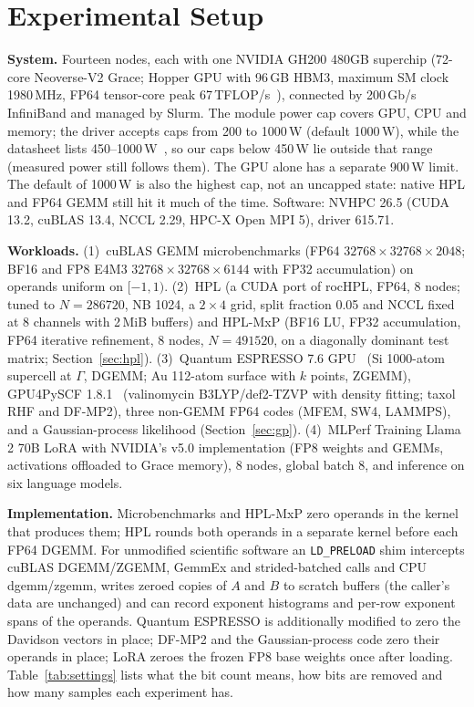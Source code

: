 \documentclass[conference]{IEEEtran}
\newcommand{\W}{\,W}
\begin{document}
\section{Experimental Setup}\label{sec:setup}

\textbf{System.} Fourteen nodes, each with one NVIDIA GH200 480GB superchip (72-core Neoverse-V2 Grace; Hopper GPU
with 96\,GB HBM3, maximum SM clock 1980\,MHz, FP64 tensor-core peak 67\,TFLOP/s~\cite{NVIDIAGH200}), connected by
200\,Gb/s InfiniBand and managed by Slurm. The module power cap covers GPU, CPU and memory; the driver accepts caps
from 200 to 1000\W{} (default 1000\W), while the datasheet lists 450--1000\W~\cite{NVIDIAGH200}, so our caps below
450\W{} lie outside that range (measured power still follows them). The GPU alone has a separate 900\W{} limit.
The default of 1000\W{} is also the highest cap, not an uncapped state: native HPL and FP64 GEMM still hit it much of
the time. Software: NVHPC 26.5 (CUDA 13.2, cuBLAS 13.4, NCCL 2.29, HPC-X Open MPI 5), driver 615.71.

\textbf{Workloads.} (1)~cuBLAS GEMM microbenchmarks (FP64 $32768{\times}32768{\times}2048$; BF16 and FP8 E4M3
$32768{\times}32768{\times}6144$ with FP32 accumulation) on operands uniform on $[-1,1)$. (2)~HPL (a CUDA port of
rocHPL, FP64, 8 nodes; tuned to $N=286720$, NB 1024, a $2\times4$ grid, split fraction 0.05 and NCCL fixed at
8 channels with 2\,MiB buffers) and HPL-MxP (BF16 LU, FP32 accumulation, FP64 iterative refinement, 8 nodes,
$N=491520$, on a diagonally dominant test matrix; Section~\ref{sec:hpl}). (3)~Quantum ESPRESSO 7.6
GPU~\cite{Giannozzi2020} (Si 1000-atom supercell at $\Gamma$, DGEMM; Au
112-atom surface with $k$ points, ZGEMM), GPU4PySCF 1.8.1~\cite{Wu2025,Li2025} (valinomycin B3LYP/def2-TZVP with density
fitting; taxol RHF and DF-MP2), three non-GEMM FP64 codes (MFEM, SW4, LAMMPS), and a Gaussian-process likelihood
(Section~\ref{sec:gp}). (4)~MLPerf Training Llama\,2 70B LoRA with NVIDIA's v5.0 implementation (FP8 weights and
GEMMs, activations offloaded to Grace memory), 8 nodes, global batch 8, and inference on six language models.

\textbf{Implementation.} Microbenchmarks and HPL-MxP zero operands in the kernel that produces them; HPL rounds both
operands in a separate kernel before each FP64 DGEMM. For
unmodified scientific software an \texttt{LD\_PRELOAD} shim intercepts cuBLAS DGEMM/ZGEMM, GemmEx and
strided-batched calls and CPU dgemm/zgemm, writes zeroed copies of $A$ and $B$ to scratch buffers (the caller's data
are unchanged) and can record exponent histograms and per-row exponent spans of the operands. Quantum ESPRESSO is
additionally modified to zero the Davidson vectors in place; DF-MP2 and the Gaussian-process code zero their
operands in place; LoRA zeroes the frozen FP8 base weights once after loading. Table~\ref{tab:settings} lists what the
bit count means, how bits are removed and how many samples each experiment has.
\end{document}
